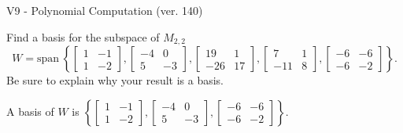 \begin{exercise}
  \begin{exerciseTitle}V9 - Polynomial Computation (ver. 140)\end{exerciseTitle}
  \begin{exerciseStatement}
    Find a basis for the subspace of \(M_{2,2}\) 
\[W=\mathrm{span}\ \left\{\left[\begin{array}{cc}
1 & -1 \\
1 & -2
\end{array}\right] , \left[\begin{array}{cc}
-4 & 0 \\
5 & -3
\end{array}\right] , \left[\begin{array}{cc}
19 & 1 \\
-26 & 17
\end{array}\right] , \left[\begin{array}{cc}
7 & 1 \\
-11 & 8
\end{array}\right] , \left[\begin{array}{cc}
-6 & -6 \\
-6 & -2
\end{array}\right]\right\}.\]
 Be sure to explain why your result is a basis.


  \end{exerciseStatement}
  \begin{exerciseAnswer}
   A basis of \(W\) is  \(\left\{\left[\begin{array}{cc}
1 & -1 \\
1 & -2
\end{array}\right] , \left[\begin{array}{cc}
-4 & 0 \\
5 & -3
\end{array}\right] , \left[\begin{array}{cc}
-6 & -6 \\
-6 & -2
\end{array}\right]\right\}\).
  


  \end{exerciseAnswer}
\end{exercise}